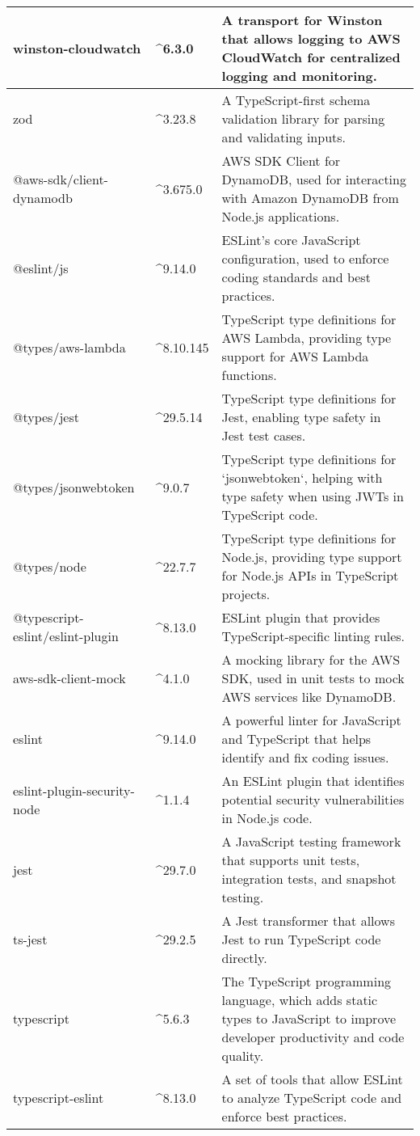 \begin{longtable}{|l|l|p{8cm}|}
winston-cloudwatch & \textasciicircum 6.3.0 & A transport for Winston that allows logging to AWS CloudWatch for centralized logging and monitoring. \\ \hline
zod & \textasciicircum 3.23.8 & A TypeScript-first schema validation library for parsing and validating inputs. \\ \hline
@aws-sdk/client-dynamodb & \textasciicircum 3.675.0 & AWS SDK Client for DynamoDB, used for interacting with Amazon DynamoDB from Node.js applications. \\ \hline
@eslint/js & \textasciicircum 9.14.0 & ESLint's core JavaScript configuration, used to enforce coding standards and best practices. \\ \hline
@types/aws-lambda & \textasciicircum 8.10.145 & TypeScript type definitions for AWS Lambda, providing type support for AWS Lambda functions. \\ \hline
@types/jest & \textasciicircum 29.5.14 & TypeScript type definitions for Jest, enabling type safety in Jest test cases. \\ \hline
@types/jsonwebtoken & \textasciicircum 9.0.7 & TypeScript type definitions for `jsonwebtoken`, helping with type safety when using JWTs in TypeScript code. \\ \hline
@types/node & \textasciicircum 22.7.7 & TypeScript type definitions for Node.js, providing type support for Node.js APIs in TypeScript projects. \\ \hline
@typescript-eslint/eslint-plugin & \textasciicircum 8.13.0 & ESLint plugin that provides TypeScript-specific linting rules. \\ \hline
aws-sdk-client-mock & \textasciicircum 4.1.0 & A mocking library for the AWS SDK, used in unit tests to mock AWS services like DynamoDB. \\ \hline
eslint & \textasciicircum 9.14.0 & A powerful linter for JavaScript and TypeScript that helps identify and fix coding issues. \\ \hline
eslint-plugin-security-node & \textasciicircum 1.1.4 & An ESLint plugin that identifies potential security vulnerabilities in Node.js code. \\ \hline
jest & \textasciicircum 29.7.0 & A JavaScript testing framework that supports unit tests, integration tests, and snapshot testing. \\ \hline
ts-jest & \textasciicircum 29.2.5 & A Jest transformer that allows Jest to run TypeScript code directly. \\ \hline
typescript & \textasciicircum 5.6.3 & The TypeScript programming language, which adds static types to JavaScript to improve developer productivity and code quality. \\ \hline
typescript-eslint & \textasciicircum 8.13.0 & A set of tools that allow ESLint to analyze TypeScript code and enforce best practices. \\ \hline
\end{longtable}

